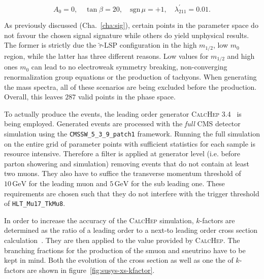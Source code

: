 \begin{equation}
  \label{eq:gen-mssm-parameters}
  A_0 = 0, \quad \tan{\beta} = 20, \quad \text{sgn}\,\mu = +1, \quad \lambda^\prime_{211} = 0.01.
\end{equation}

As previously discussed (Cha.~\ref{cha:sig}), certain points in the parameter space do not favour the chosen signal signature while others do yield unphysical results. The former is strictly due the $\tilde{\tau}$-LSP configuration in the high $m_{1/2}$, low $m_0$ region, while the latter has three different reasons. Low values for $m_{1/2}$ and high ones $m_0$ can lead to no electroweak symmetry breaking, non-converging renormalization group equations or the production of tachyons. When generating the mass spectra, all of these scenarios are being excluded before the production. Overall, this leaves $287$ valid points in the phase space.

To actually produce the events, the leading order generator \textsc{CalcHep 3.4}~\cite{calchep} is being employed. Generated events are processed with the \textit{full} CMS detector simulation using the \verb+CMSSW_5_3_9_patch1+ framework. Running the full simulation on the entire grid of parameter points with sufficient statistics for each sample is resource intensive. Therefore a filter is applied at generator level (i.e. before parton showering and simulation) removing events that do not contain at least two muons. They also have to suffice the transverse momentum threshold of $10\,\text{GeV}$ for the leading muon and $5\,\text{GeV}$ for the sub leading one. These requirements are chosen such that they do not interfere with the trigger threshold of \verb+HLT_Mu17_TkMu8+.

In order to increase the accuracy of the \textsc{CalcHep} simulation, $k$-factors are determined as the ratio of a leading order to a next-to leading order cross section calculation~\cite{susyxstool}. They are then applied to the value provided by \textsc{CalcHep}. The branching fractions for the production of the smuon and sneutrino have to be kept in mind. Both the evolution of the cross section as well as one the of $k$-factors are shown in figure~\ref{fig:susys-xs-kfactor}.


